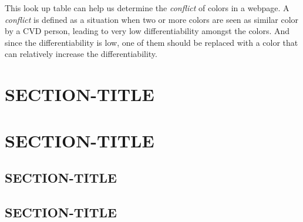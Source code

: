 This look up table can help us determine the \textit{conflict} of colors in a webpage. A \textit{conflict} is defined as a situation when two or more colors are seen as similar color by a CVD person, leading to very low differentiability amongst the colors. And since the differentiability is low, one of them should be replaced with a color that can relatively increase the differentiability.
 
\section{SECTION-TITLE}
\label{SECTION-LABEL}

\section{SECTION-TITLE}
\label{SECTION-LABEL}

\subsection{SECTION-TITLE}
\label{SECTION-LABEL}

\subsection{SECTION-TITLE}
\label{SECTION-LABEL}